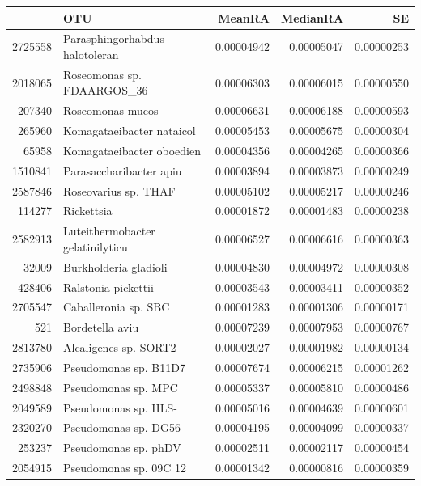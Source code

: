 \begin{table}[ht]
\centering
\begin{tabular}{rlrrr}
  \hline
 & OTU & MeanRA & MedianRA & SE \\ 
  \hline
2725558 & Parasphingorhabdus halotoleran & 0.00004942 & 0.00005047 & 0.00000253 \\ 
  2018065 & Roseomonas sp. FDAARGOS\_36 & 0.00006303 & 0.00006015 & 0.00000550 \\ 
  207340 & Roseomonas mucos & 0.00006631 & 0.00006188 & 0.00000593 \\ 
  265960 & Komagataeibacter nataicol & 0.00005453 & 0.00005675 & 0.00000304 \\ 
  65958 & Komagataeibacter oboedien & 0.00004356 & 0.00004265 & 0.00000366 \\ 
  1510841 & Parasaccharibacter apiu & 0.00003894 & 0.00003873 & 0.00000249 \\ 
  2587846 & Roseovarius sp. THAF & 0.00005102 & 0.00005217 & 0.00000246 \\ 
  114277 & Rickettsia & 0.00001872 & 0.00001483 & 0.00000238 \\ 
  2582913 & Luteithermobacter gelatinilyticu & 0.00006527 & 0.00006616 & 0.00000363 \\ 
  32009 & Burkholderia gladioli & 0.00004830 & 0.00004972 & 0.00000308 \\ 
  428406 & Ralstonia pickettii & 0.00003543 & 0.00003411 & 0.00000352 \\ 
  2705547 & Caballeronia sp. SBC & 0.00001283 & 0.00001306 & 0.00000171 \\ 
  521 & Bordetella aviu & 0.00007239 & 0.00007953 & 0.00000767 \\ 
  2813780 & Alcaligenes sp. SORT2 & 0.00002027 & 0.00001982 & 0.00000134 \\ 
  2735906 & Pseudomonas sp. B11D7 & 0.00007674 & 0.00006215 & 0.00001262 \\ 
  2498848 & Pseudomonas sp. MPC & 0.00005337 & 0.00005810 & 0.00000486 \\ 
  2049589 & Pseudomonas sp. HLS- & 0.00005016 & 0.00004639 & 0.00000601 \\ 
  2320270 & Pseudomonas sp. DG56- & 0.00004195 & 0.00004099 & 0.00000337 \\ 
  253237 & Pseudomonas sp. phDV & 0.00002511 & 0.00002117 & 0.00000454 \\ 
  2054915 & Pseudomonas sp. 09C 12 & 0.00001342 & 0.00000816 & 0.00000359 \\ 

\end{tabular}
\end{table}
